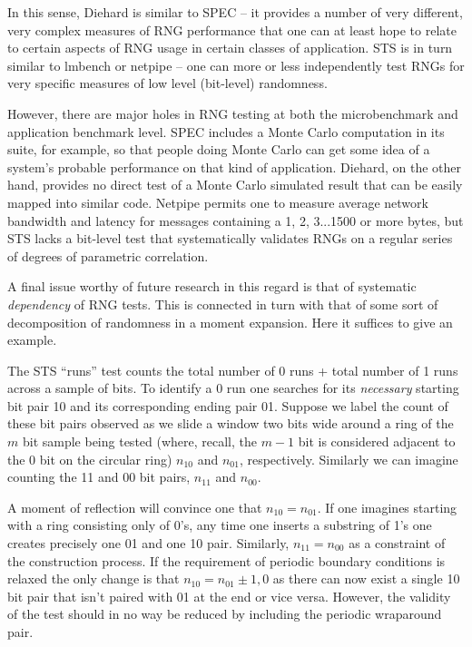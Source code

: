 \documentclass[12pt]{book}
\begin{document}
In this sense, Diehard is similar to SPEC -- it provides a number of
very different, very complex measures of RNG performance that one can at
least hope to relate to certain aspects of RNG usage in certain classes
of application.  STS is in turn similar to lmbench or netpipe -- one can
more or less independently test RNGs for very specific measures of low
level (bit-level) randomness.

However, there are major holes in RNG testing at both the microbenchmark
and application benchmark level.  SPEC includes a Monte Carlo
computation in its suite, for example, so that people doing Monte Carlo
can get some idea of a system's probable performance on that kind of
application.  Diehard, on the other hand, provides no direct test of a
Monte Carlo simulated result that can be easily mapped into similar
code.  Netpipe permits one to measure average network bandwidth and
latency for messages containing a 1, 2, 3...1500 or more bytes, but STS
lacks a bit-level test that systematically validates RNGs on a regular
series of degrees of parametric correlation.

A final issue worthy of future research in this regard is that of
systematic {\em dependency} of RNG tests.  This is connected in turn
with that of some sort of decomposition of randomness in a moment
expansion.  Here it suffices to give an example.  

The STS ``runs'' test counts the total number of 0 runs + total number
of 1 runs across a sample of bits.  To identify a 0 run one searches for
its {\em necessary} starting bit pair 10 and its corresponding ending
pair 01.  Suppose we label the count of these bit pairs observed as we
slide a window two bits wide around a ring of the $m$ bit sample being
tested (where, recall, the $m-1$ bit is considered adjacent to the $0$
bit on the circular ring) $n_{10}$ and $n_{01}$, respectively.  Similarly
we can imagine counting the 11 and 00 bit pairs, $n_{11}$ and $n_{00}$.

A moment of reflection will convince one that $n_{10} = n_{01}$.  If one
imagines starting with a ring consisting only of 0's, any time one
inserts a substring of 1's one creates precisely one 01 and one 10 pair.
Similarly, $n_{11} = n_{00}$ as a constraint of the construction
process.  If the requirement of periodic boundary conditions is relaxed
the only change is that $n_{10} = n_{01} \pm 1,0$ as there can now exist
a single 10 bit pair that isn't paired with 01 at the end or vice versa.
However, the validity of the test should in no way be reduced by
including the periodic wraparound pair.
\end{document}
